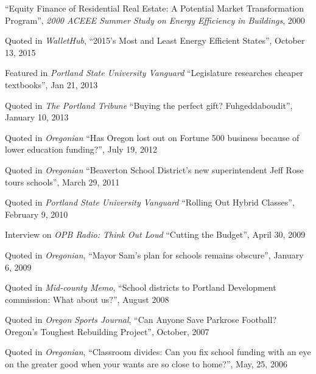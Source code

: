 \documentclass[Computer Science]{vita}
\begin{document}
\begin{vita}
\begin{Presentations and Invited Talks}
  \item ``Equity Finance of Residential Real Estate: A Potential
    Market Transformation Program'', \emph{2000 ACEEE Summer Study on
      Energy Efficiency in Buildings}, 2000

  \end{Presentations and Invited Talks}



  \begin{Media Outreach}
  
  \item Quoted in \emph{WalletHub}, ``2015’s Most and Least Energy Efficient States'', October 13, 2015
  
  \item Featured in \emph{Portland State University Vanguard} ``Legislature researches cheaper textbooks'', Jan 21, 2013
  
  \item Quoted in \emph{The Portland Tribune} ``Buying the perfect gift? Fuhgeddaboudit'', January 10, 2013
  
\item Quoted in \emph{Oregonian} ``Has Oregon lost out on Fortune 500 business because of lower education funding?'', July 19, 2012

\item Quoted in \emph{Oregonian} ``Beaverton School District's new superintendent Jeff Rose tours schools'', March 29, 2011
  
  \item Quoted in \emph{Portland State University Vanguard} ``Rolling Out Hybrid Classes'', February 9, 2010
  
  \item Interview on \emph{OPB Radio: Think Out Loud} ``Cutting the
    Budget'', April 30, 2009

  \item Quoted in \emph{Oregonian}, ``Mayor Sam's plan for schools
    remains obscure'', January 6, 2009

  \item Quoted in \emph{Mid-county Memo}, ``School districts to
    Portland Development commission: What about us?'', August 2008

  \item Quoted in \emph{Oregon Sports Journal}, ``Can Anyone Save
    Parkrose Football?  Oregon's Toughest Rebuilding Project'',
    October, 2007

  \item Quoted in \emph{Oregonian}, ``Classroom divides: Can you fix
    school funding with an eye on the greater good when your wants are
    so close to home?'', May, 25, 2006


\end{Media Outreach}
\end{vita}
\end{document}

